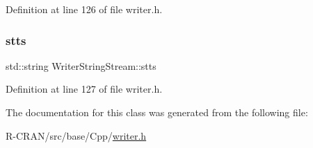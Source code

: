 Definition at line 126 of file writer.\+h.

\mbox{\label{classWriterStringStream_a7dc8eef2d1616689d994b14d9b68ff89}} 
\subsubsection{\texorpdfstring{stts}{stts}}
{\footnotesize\ttfamily std\+::string Writer\+String\+Stream\+::stts\hspace{0.3cm}{\ttfamily [private]}}



Definition at line 127 of file writer.\+h.



The documentation for this class was generated from the following file\+:\begin{DoxyCompactItemize}
\item 
R-\/\+C\+R\+A\+N/src/base/\+Cpp/\hyperlink{writer_8h}{writer.\+h}\end{DoxyCompactItemize}
